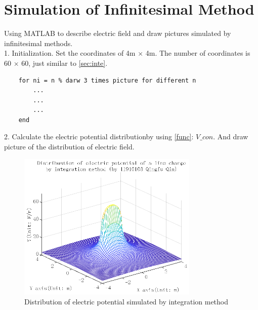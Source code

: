 \documentclass[10pt, journal, final]{IEEEtran}
\begin{document}
\section{
  Simulation of Infinitesimal Method
 }
 \label{sec:inf}
Using MATLAB to describe electric field and draw pictures
simulated by infinitesimal methods.\\
1. Initialization. Set the coordinates of 4m $\times$ 4m.
The number of coordinates is 60 $\times$ 60,
just similar to \ref{sec:inte}.

\label{work2.1}


\begin{lstlisting}
    for ni = n % darw 3 times picture for different n
        ...
        ...
        ...
    end
\end{lstlisting}

2. Calculate the electric potential distributionby using \ref{func}: $V\_con$.
And draw picture of the distribution of electric field.

\label{work1.3}

\begin{figure}[htbp]
    \centering
    \includegraphics[width = 3.4in]{figures/fig1.1.eps}
    \caption{Distribution of electric potential simulated by integration method}
    \label{fig:1.1}
\end{figure}
\end{document}
